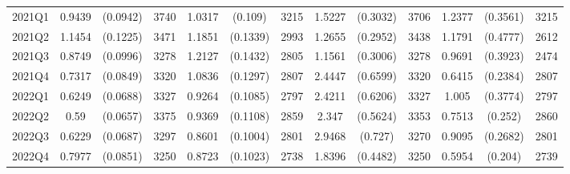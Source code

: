 \begin{tabular}{l|ccc|ccc|ccc|ccc}
2021Q1 &    0.9439 &  (0.0942) &  3740 &    1.0317 &   (0.109) &  3215 &          1.5227 &  (0.3032) &  3706 &    1.2377 &  (0.3561) &  3215 \\
2021Q2 &    1.1454 &  (0.1225) &  3471 &    1.1851 &  (0.1339) &  2993 &          1.2655 &  (0.2952) &  3438 &    1.1791 &  (0.4777) &  2612 \\
2021Q3 &    0.8749 &  (0.0996) &  3278 &    1.2127 &  (0.1432) &  2805 &          1.1561 &  (0.3006) &  3278 &    0.9691 &  (0.3923) &  2474 \\
2021Q4 &    0.7317 &  (0.0849) &  3320 &    1.0836 &  (0.1297) &  2807 &          2.4447 &  (0.6599) &  3320 &    0.6415 &  (0.2384) &  2807 \\
2022Q1 &    0.6249 &  (0.0688) &  3327 &    0.9264 &  (0.1085) &  2797 &          2.4211 &  (0.6206) &  3327 &     1.005 &  (0.3774) &  2797 \\
2022Q2 &      0.59 &  (0.0657) &  3375 &    0.9369 &  (0.1108) &  2859 &           2.347 &  (0.5624) &  3353 &    0.7513 &   (0.252) &  2860 \\
2022Q3 &    0.6229 &  (0.0687) &  3297 &    0.8601 &  (0.1004) &  2801 &          2.9468 &   (0.727) &  3270 &    0.9095 &  (0.2682) &  2801 \\
2022Q4 &    0.7977 &  (0.0851) &  3250 &    0.8723 &  (0.1023) &  2738 &          1.8396 &  (0.4482) &  3250 &    0.5954 &   (0.204) &  2739 \\
\bottomrule
\end{tabular}
